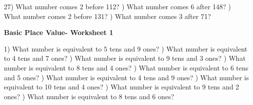 \documentclass{article}%
\begin{document}
27) What number comes 2 before 112?%
\newline%
\newline%
) What number comes 6 after 148?%
\newline%
\newline%
) What number comes 2 before 131?%
\newline%
\newline%
) What number comes 3 after 71?%
\newline%
\newline%
\newline%
\pagebreak%
\large%
\begin{center}%
\textbf{Basic Place Value- Worksheet 1}%
\newline%
\end{center} \normalsize%
1) What number is equivalent to 5 tens and 9 ones?%
\newline%
\newline%
) What number is equivalent to 4 tens and 7 ones?%
\newline%
\newline%
) What number is equivalent to 9 tens and 3 ones?%
\newline%
\newline%
) What number is equivalent to 8 tens and 4 ones?%
\newline%
\newline%
) What number is equivalent to 6 tens and 5 ones?%
\newline%
\newline%
) What number is equivalent to 4 tens and 9 ones?%
\newline%
\newline%
) What number is equivalent to 10 tens and 4 ones?%
\newline%
\newline%
) What number is equivalent to 9 tens and 2 ones?%
\newline%
\newline%
) What number is equivalent to 8 tens and 6 ones?%
\end{document}
